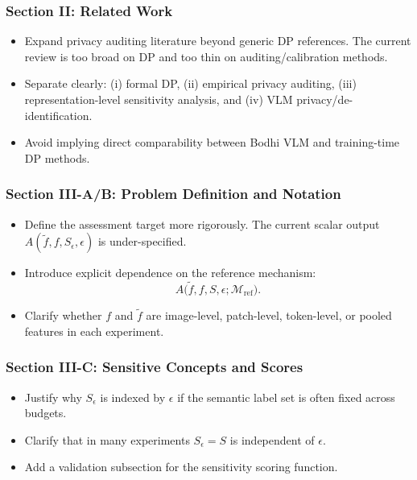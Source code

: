 \subsubsection*{Section II: Related Work}
\begin{itemize}
    \item Expand privacy auditing literature beyond generic DP references. The current review is too broad on DP and too thin on auditing/calibration methods.
    \item Separate clearly: (i) formal DP, (ii) empirical privacy auditing, (iii) representation-level sensitivity analysis, and (iv) VLM privacy/de-identification.
    \item Avoid implying direct comparability between Bodhi VLM and training-time DP methods.
\end{itemize}

\subsubsection*{Section III-A/B: Problem Definition and Notation}
\begin{itemize}
    \item Define the assessment target more rigorously. The current scalar output $A(\tilde{f}, f, S_{\epsilon}, \epsilon)$ is under-specified.
    \item Introduce explicit dependence on the reference mechanism:
    \begin{equation}
    A\big(\tilde{f}, f, S, \epsilon; \mathcal{M}_{\mathrm{ref}}\big).
    \end{equation}
    \item Clarify whether $f$ and $\tilde{f}$ are image-level, patch-level, token-level, or pooled features in each experiment.
\end{itemize}

\subsubsection*{Section III-C: Sensitive Concepts and Scores}
\begin{itemize}
    \item Justify why $S_{\epsilon}$ is indexed by $\epsilon$ if the semantic label set is often fixed across budgets.
    \item Clarify that in many experiments $S_{\epsilon} = S$ is independent of $\epsilon$.
    \item Add a validation subsection for the sensitivity scoring function.
\end{itemize}

